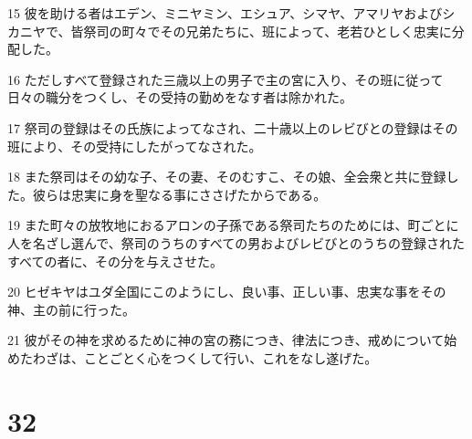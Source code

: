 \par 15 彼を助ける者はエデン、ミニヤミン、エシュア、シマヤ、アマリヤおよびシカニヤで、皆祭司の町々でその兄弟たちに、班によって、老若ひとしく忠実に分配した。
\par 16 ただしすべて登録された三歳以上の男子で主の宮に入り、その班に従って日々の職分をつくし、その受持の勤めをなす者は除かれた。
\par 17 祭司の登録はその氏族によってなされ、二十歳以上のレビびとの登録はその班により、その受持にしたがってなされた。
\par 18 また祭司はその幼な子、その妻、そのむすこ、その娘、全会衆と共に登録した。彼らは忠実に身を聖なる事にささげたからである。
\par 19 また町々の放牧地におるアロンの子孫である祭司たちのためには、町ごとに人を名ざし選んで、祭司のうちのすべての男およびレビびとのうちの登録されたすべての者に、その分を与えさせた。
\par 20 ヒゼキヤはユダ全国にこのようにし、良い事、正しい事、忠実な事をその神、主の前に行った。
\par 21 彼がその神を求めるために神の宮の務につき、律法につき、戒めについて始めたわざは、ことごとく心をつくして行い、これをなし遂げた。

\chapter{32}

